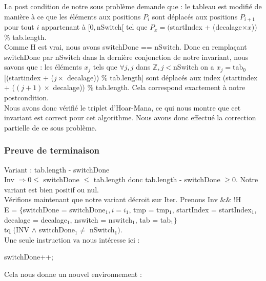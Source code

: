La post condition de notre sous problème demande que : le tableau est modifié de manière à ce que les éléments aux positions $P_{i}$ sont déplacés aux positions $P_{i+1}$ pour tout $i$ appartenant à $[0,$nSwitch[ tel que $P_{x} = ($startIndex + (decalage$\times x$)) \% tab.length.\\

Comme H est vrai, nous avons switchDone == nSwitch. Donc en remplaçant switchDone par nSwitch dans la dernière conjonction de notre invariant, nous savons que : les éléments $x_{j}$ tels que $\forall j, j$ dans $\mathbb{Z}, j<$nSwitch on a $x_{j}=$tab$_{0}$[(startindex + ($j\times$ decalage)) \% tab.length] sont déplacés aux index (startindex + ($(j+1)\times$ decalage)) \% tab.length. 
Cela correspond exactement à notre postcondition.\\

Nous avons donc vérifié le triplet d'Hoar-Mana, ce qui nous montre que cet invariant est correct pour cet algorithme. 
Nous avons donc effectué la correction partielle de ce sous problème. 


\subsubsection*{Preuve de terminaison}
Variant  : tab.length - switchDone\\

Inv $\Rightarrow 0 \leq$ switchDone $\leq$ tab.length donc tab.length - switchDone $\geq 0$. Notre variant est bien positif ou nul.\\ 

Vérifions maintenant que notre variant décroit sur Iter. Prenons Inv $\&\&$ !H \\

E = $\{ $switchDone = switchDone$_{1}, i = i_{1}$, tmp = tmp$_{1}$, startIndex = startIndex$_{1}$, decalage = decalage$_{1}$, nswitch = nswitch$_{1}$, tab = tab$_{1}\}$\\
tq (INV $\wedge$ switchDone$_{1} \neq$ nSwitch$_{1})$.\\

Une seule instruction va nous intéresse ici : \\

\begin{center}
  switchDone++;\\
\end{center} 
 
Cela nous donne un nouvel environnement :\\

